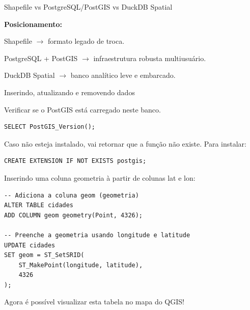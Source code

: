 \documentclass{beamer}
\begin{document}
\begin{frame}{Shapefile vs PostgreSQL/PostGIS vs DuckDB Spatial}
    
    \vspace{0.4cm}
    
    \textbf{Posicionamento:}
    
    Shapefile $\rightarrow$ formato legado de troca.
    
    PostgreSQL + PostGIS $\rightarrow$ infraestrutura robusta multiusuário.
    
    DuckDB Spatial $\rightarrow$ banco analítico leve e embarcado.
\end{frame}

\begin{frame}[fragile]{Inserindo, atualizando e removendo dados}
    
    Verificar se o PostGIS está carregado neste banco. 
    \begin{verbatim}
SELECT PostGIS_Version();
    \end{verbatim}
    Caso não esteja instalado, vai retornar que a função não existe. Para instalar:
    \begin{verbatim}
CREATE EXTENSION IF NOT EXISTS postgis;
    \end{verbatim}


    Inserindo uma coluna geometria à partir de colunas lat e lon:
    
    \vspace{0.3cm}

    \begin{verbatim}
-- Adiciona a coluna geom (geometria)
ALTER TABLE cidades
ADD COLUMN geom geometry(Point, 4326);

-- Preenche a geometria usando longitude e latitude
UPDATE cidades
SET geom = ST_SetSRID(
    ST_MakePoint(longitude, latitude),
    4326
);
    \end{verbatim}
Agora é possível visualizar esta tabela no mapa do QGIS!

\end{frame}
\end{document}
